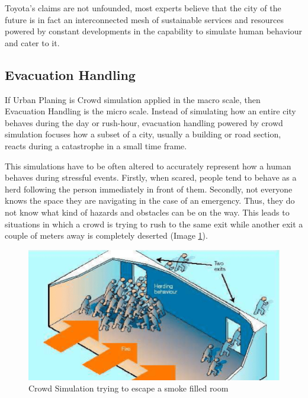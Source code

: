 \documentclass[sigconf]{acmart}
\begin{document}
Toyota's claims are not unfounded, most experts believe that the city of the future is in fact an interconnected
mesh of sustainable services and resources powered by constant developments in the capability to simulate human
behaviour and cater to it.

\subsection{Evacuation Handling}

If Urban Planing is Crowd simulation applied in the macro scale, then Evacuation Handling is the micro scale.
Instead of simulating how an entire city behaves during the day or rush-hour, evacuation handling powered by
crowd simulation focuses how a subset of a city, usually a building or road section, reacts during a catastrophe
in a small time frame\cite{Evacuation}.

This simulations have to be often altered to accurately represent how a human behaves during stressful
events\cite{evacuationRobots}.
Firstly, when scared, people tend to behave as a herd following the person immediately in front of them.
Secondly, not everyone knows the space they are navigating in the case of an emergency. Thus, they do
not know what kind of hazards and obstacles can be on the way.
This leads to situations in which a crowd is trying to rush to the same exit while another exit a couple of
meters away is completely deserted (Image \ref{fig:crowdBuilUp}).

\begin{figure}[h]
  \centering
  \includegraphics[width=\linewidth]{images/crowd_escape.png}
  \caption{Crowd Simulation trying to escape a smoke filled room}
  \label{fig:crowdBuilUp}
\end{figure}
\end{document}
